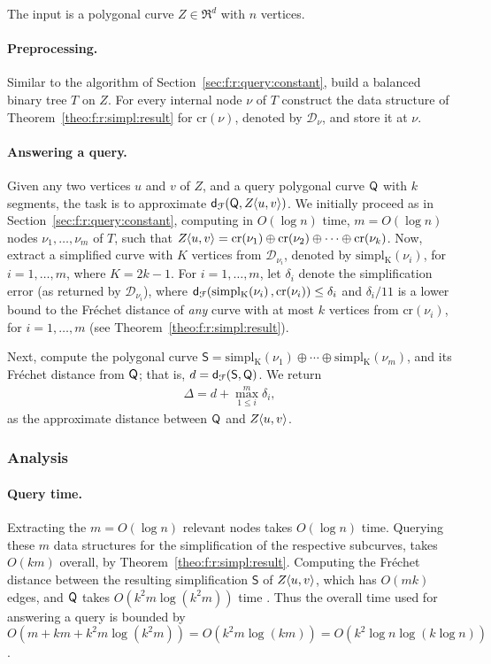 \documentclass[12pt]{article}
\newcommand{\secref}[1]{Section~\ref{sec:#1}}
\newcommand{\thmref}[1]{Theorem~\ref{theo:#1}}
\newcommand{\ts}{\hspace{0.6pt}}
\newcommand{\Frechet}{Fr\'{e}c{h}e{}t\xspace}\providecommand{\Arr}{\mathop{\mathrm{\EuScript{A}}}}
\newcommand{\distFr}[2]{\mathsf{d}_{\EuScript{F}}\pth{#1, #2}}
\newcommand{\cS}{\mathsf{S}}
\newcommand{\cZ}{{Z}}
\providecommand{\pth}[2][\!]{#1\left({#2}\right)}
\newcommand{\concatOp}{\oplus}
\newcommand{\SC}[3]{{#1}\!\!\ts\ts \left\langle  #2, #3 \right\rangle}
\newcommand{\Tree}{T}
\newcommand{\node}{\nu}
\newcommand{\cNode}[1]{\mathrm{c{}r}\pth{#1}}
\newcommand{\kNode}[2]{\mathrm{s{}i{}m{}p{}l_{#1}}\pth{#2}}
\newcommand{\DSX}[1]{\mathcal{D}_{#1}}
\newcommand{\SNumVertices}[1]{2#1 - 1}
\numberwithin{figure}{section}
\numberwithin{equation}{section}
\newcommand{\Eqlab}[1]{\label{equation:#1}}
\begin{document}
The input is a polygonal curve $\cZ \in \Re^d$ with $n$ vertices.

\paragraph{Preprocessing.}
Similar to the algorithm of \secref{f:r:query:constant}, build a
balanced binary tree $\Tree$ on $\cZ$. For every internal node $\node$
of $\Tree$ construct the data structure of \thmref{f:r:simpl:result}
for $\cNode{\node}$, denoted by $\DSX{\node}$, and store it at
$\node$.

\paragraph{Answering a query.}
Given any two vertices $u$ and $v$ of $\cZ$, and a query polygonal
curve $\mathsf{Q}$ with $k$ segments, the task is to approximate
$\distFr{\cQ}{\SC{\cZ}{u}{v}}$. We initially proceed as in
\secref{f:r:query:constant}, computing in $O( \log n)$ time, $m=O(\log
n)$ nodes $\node_1, \ldots, \node_m$ of $\Tree$, such that
$\SC{\cZ}{u}{v} = \cNode{\node_1} \concatOp \cNode{\node_2} \concatOp
\cdots \concatOp \cNode{\node_k}$.  Now, extract a simplified curve
with $K$ vertices from $\DSX{\node_i}$, denoted by
$\kNode{K}{\node_i}$, for $i=1,\ldots, m$, where $K =
\SNumVertices{k}$.  For $i=1,\ldots, m$, let $\delta_i$ denote the
simplification error (as returned by $\DSX{\node_i}$), where
$\distFr{\kNode{K}{\node_i}}{ \cNode{\node_i}} \leq \delta_i$ and
$\delta_i/11$ is a lower bound to the \Frechet distance of \emph{any}
curve with at most $k$ vertices from $\cNode{\node_i}$, for
$i=1,\ldots, m$ (see \thmref{f:r:simpl:result}).

Next, compute the polygonal curve $\cS = \kNode{K}{\node_1} \concatOp
\cdots \concatOp \kNode{K}{\node_m}$, and its \Frechet distance from
$\mathsf{Q}$; that is, $d = \distFr{\cS}{\cQ}$.  We return
\begin{align}
    \Delta = d + \max_{1\leq i}^{m}\delta_i,\Eqlab{delta}
\end{align}
as the approximate distance between $\mathsf{Q}$ and $\SC{\cZ}{u}{v}$.

\subsubsection{Analysis}

\paragraph{Query time.}
Extracting the $m=O(\log n)$ relevant nodes takes $O(\log n)$ time.
Querying these $m$ data structures for the simplification of the
respective subcurves, takes $O(k m)$ overall, by
\thmref{f:r:simpl:result}.  Computing the \Frechet distance between
the resulting simplification $\cS$ of $\SC{\cZ}{u}{v}$, which has $O(m
k)$ edges, and $\mathsf{Q}$ takes $O(k^2m \log(k^2m))$ time
\cite{ag-cfdbt-95}.  Thus the overall time used for answering a query
is bounded by $O\pth{ m + km + k^2m \log(k^2m)} = O\pth{ k^2m
   \log(km)} = O\pth{ k^2 \log n \log (k \log n ) }$.
\end{document}
